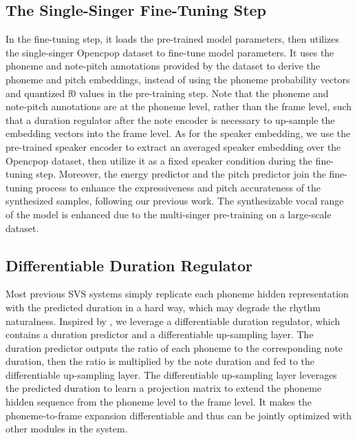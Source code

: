 \subsection{The Single-Singer Fine-Tuning Step}
In the fine-tuning step, it loads the pre-trained model parameters, then utilizes the single-singer Opencpop dataset to fine-tune model parameters.
It uses the phoneme and note-pitch annotations provided by the dataset to derive the phoneme and pitch embeddings, instead of using the phoneme probability vectors and quantized f0 values in the pre-training step.
Note that the phoneme and note-pitch annotations are at the phoneme level, rather than the frame level, such that a duration regulator after the note encoder is necessary to up-sample the embedding vectors into the frame level.
As for the speaker embedding, we use the pre-trained speaker encoder to extract an averaged speaker embedding over the Opencpop dataset, then utilize it as a fixed speaker condition during the fine-tuning step.
Moreover, the energy predictor and the pitch predictor join the fine-tuning process to enhance the expressiveness and pitch accurateness of the synthesized samples, following our previous work\cite{zhou22f_interspeech}.
The synthesizable vocal range of the model is enhanced due to the multi-singer pre-training on a large-scale dataset.

\subsection{Differentiable Duration Regulator}
Most previous SVS systems simply replicate each phoneme hidden representation with the predicted duration in a hard way, which may degrade the rhythm naturalness.
Inspired by \cite{tan2022naturalspeech}, we leverage a differentiable duration regulator, which contains a duration predictor and a differentiable up-sampling layer. 
The duration predictor outputs the ratio of each phoneme to the corresponding note duration, then the ratio is multiplied by the note duration and fed to the differentiable up-sampling layer.
The differentiable up-sampling layer leverages the predicted duration to learn a projection matrix to extend the phoneme hidden sequence from the phoneme level to the frame level.
It makes the phoneme-to-frame expansion differentiable and thus can be jointly optimized with other modules in the system.


